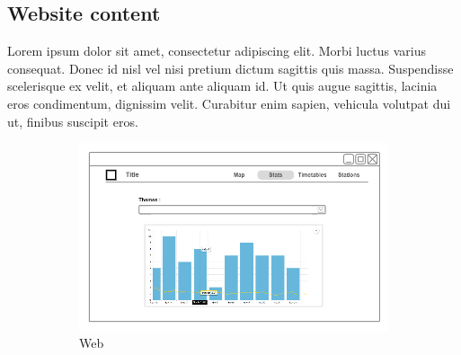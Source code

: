 \subsection{Website content}

Lorem ipsum dolor sit amet, consectetur adipiscing elit. Morbi luctus varius consequat. Donec id nisl vel nisi pretium dictum sagittis quis massa. Suspendisse scelerisque ex velit, et aliquam ante aliquam id. Ut quis augue sagittis, lacinia eros condimentum, dignissim velit. Curabitur enim sapien, vehicula volutpat dui ut, finibus suscipit eros. 

\begin{figure}[ht]
    \centering
    \begin{subfigure}[b]{0.6\textwidth}
        \includegraphics[width=\textwidth]
          {img/c02-application/png/web-website-stats.png}
        \caption{Web}
    \end{subfigure}
    ~
    \begin{subfigure}[b]{0.2\textwidth}

\end{subfigure}
\end{figure}
